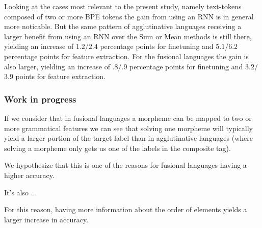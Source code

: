 \documentclass[11pt]{article}
\begin{document}
         Looking at the cases most relevant to the present study,
     namely text-tokens composed of two or more BPE tokens the gain
     from using an RNN is in general more noticable. But the same
     pattern of agglutinative languages receiving a larger benefit
     from using an RNN over the Sum or Mean methods is still there,
     yielding an increase of $1.2$/$2.4$ percentage points for
     finetuning and $5.1$/$6.2$ percentage points for feature
     extraction. For the fusional languages the gain is also larger,
     yielding an increase of $.8$/$.9$ percentage points for
     finetuning and $3.2$/$3.9$ points for feature extraction.

     \subsubsection{Work in progress}

        If we consider that in fusional languages a morpheme can be
     mapped to two or more grammatical features we can see that
     solving one morpheme will typically yield a larger portion of the
     target label than in agglutinative languages (where solving a
     morpheme only gets us one of the labels in the composite tag).

    We hypothesize that this is one of the reasons for fusional languages having a higher accuracy. 

    It's also ...
        
    For this reason, having more information about the order of
     elements yields a larger increase in accuracy. 

     
     



\end{document}
